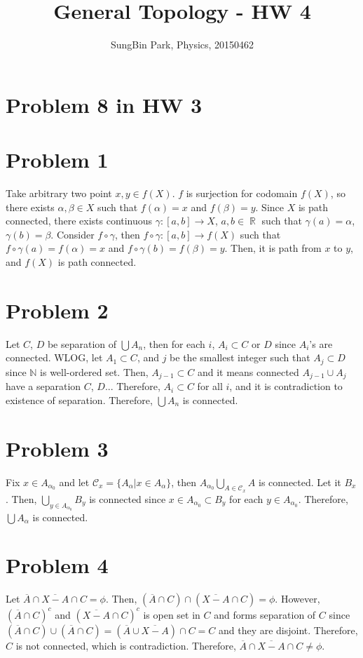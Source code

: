 \documentclass{article}
\DeclareMathOperator{\rr}{\mathbb{R}}
\begin{document}
\title{General Topology - HW 4}
\author{SungBin Park, Physics, 20150462} 

 \maketitle
\section*{Problem 8 in HW 3}
\section*{Problem 1}
Take arbitrary two point $x,y\in f(X)$. $f$ is surjection for codomain $f(X)$, so there exists $\alpha, \beta\in X$ such that $f(\alpha)=x$ and $f(\beta)=y$. Since $X$ is path connected, there exists continuous $\gamma:[a,b]\rightarrow X$, $a,b\in \rr$ such that $\gamma(a)=\alpha$, $\gamma(b)=\beta$. Consider $f\circ \gamma$, then $f\circ \gamma:[a,b]\rightarrow f(X)$ such that $f\circ \gamma(a)=f(\alpha)=x$ and $f\circ\gamma(b)=f(\beta)=y$. Then, it is path from $x$ to $y$, and $f(X)$ is path connected.
\section*{Problem 2}
Let $C$, $D$ be separation of $\bigcup A_n$, then for each $i$, $A_i\subset C$ or $D$ since $A_i$'s are connected. WLOG, let $A_1\subset C$, and $j$ be the smallest integer such that $A_j \subset D$ since $\mathbb{N}$ is well-ordered set. Then, $A_{j-1}\subset C$ and it means connected $A_{j-1}\cup A_{j}$ have a separation $C$, $D$... Therefore, $A_i\subset C$ for all $i$, and it is contradiction to existence of separation. Therefore, $\bigcup A_n$ is connected.
\section*{Problem 3}
Fix $x\in A_{\alpha_0}$ and let $\mathcal{C}_x=\{A_{\alpha}|x\in A_{\alpha}\}$, then $A_{\alpha_0}\bigcup_{A\in \mathcal{C}_x} A$ is connected. Let it $B_x$. Then, $\bigcup_{y\in A_{\alpha_0}} B_y$ is connected since $x\in A_{\alpha_0}\subset B_y$ for each $y\in A_{\alpha_0}$. Therefore, $\bigcup A_\alpha$ is connected.
\section*{Problem 4}
Let $\overline{A}\cap \overline{X-A}\cap C=\phi$. Then, $\left(\overline{A}\cap C\right)\cap\left(\overline{X-A}\cap C\right)=\phi$. However, $\left(\overline{A}\cap C\right)^c$ and $\left(\overline{X-A}\cap C\right)^c$ is open set in $C$ and forms separation of $C$ since $\left(\overline{A}\cap C\right)\cup \left(\overline{A}\cap C\right) = \left(\overline{A}\cup \overline{X-A}\right) \cap C=C$ and they are disjoint. Therefore, $C$ is not connected, which is contradiction. Therefore, $\overline{A}\cap \overline{X-A}\cap C\neq\phi$.
\end{document}
